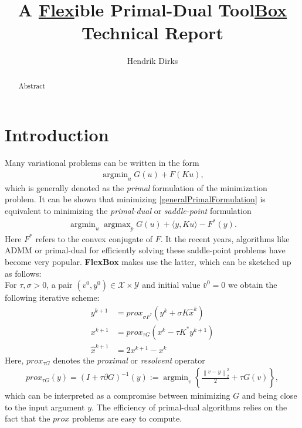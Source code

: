 \documentclass[final,leqno,onefignum,onetabnum]{article}
\title{A \textbf{\underline{Flex}}ible Primal-Dual Tool\textbf{\underline{Box}} \\\large Technical Report}
\author{Hendrik Dirks}
\newcommand{\1}[1]{\mathds{1}_{#1}}
\DeclareMathOperator*{\argmin}{\arg \min}%
\DeclareMathOperator*{\argmax}{\arg \max}%
\begin{document}
	
\maketitle

\begin{abstract}
	Abstract
\end{abstract}

\section{Introduction}
Many variational problems can be written in the form
\begin{align}
	\argmin_{u} G(u) + F(Ku),
	\label{generalPrimalFormulation}
\end{align}
which is generally denoted as the \textit{primal} formulation of the minimization problem. It can be shown that minimizing \eqref{generalPrimalFormulation} is equivalent  to minimizing the \textit{primal-dual} or \textit{saddle-point} formulation
\begin{align}
	\argmin_{u}\argmax_{p} G(u) + \langle y,Ku\rangle - F^*(y).
\label{generalPrimalDualFormulation}
\end{align}
Here $F^*$ refers to the convex conjugate of $F$. It the recent years, algorithms like ADMM or primal-dual  for efficiently solving these saddle-point problems have become very popular. \textbf{FlexBox} makes use the latter, which can be sketched up as follows:\\
For $\tau,\sigma>0$, a pair $(v^0,y^0)\in\mathcal{X}\times\mathcal{Y}$ and initial value $\bar{v}^0=0$ we obtain the following iterative scheme:
\begin{align}
	y^{k+1} &= prox_{\sigma F^*}(y^k+\sigma K\hat{x}^k)\\
	x^{k+1} &=  prox_{\tau G}(x^k-\tau K^* y^{k+1})\\
	\hat{x}^{k+1} & = 2 x^{k+1} -x^k
	\label{pdAlgorithm}
\end{align}
Here, $prox_{\tau G}$ denotes the \textit{proximal} or \textit{resolvent} operator
\begin{align*}
	prox_{\tau G}(y) = \left( I+\tau \partial G\right)^{-1}(y) := \argmin_v \left\{ \frac{\left\| v-y \right\|_2^2}{2}+\tau G(v) \right\} ,
\end{align*}
which can be interpreted as a compromise between minimizing $G$ and being close to the input argument $y$. The efficiency of primal-dual algorithms relies on the fact that the $prox$ problems are easy to compute.
\end{document}
